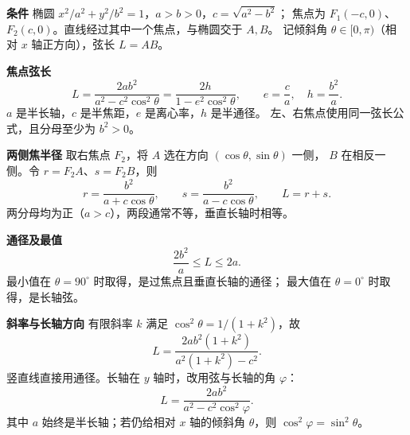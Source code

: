 \begin{statementbox}
\textbf{\textcolor{CStatement}{条件}}
椭圆 $x^2/a^2+y^2/b^2=1$，$a>b>0$，$c=\sqrt{a^2-b^2}$；
焦点为 $F_1(-c,0)$、$F_2(c,0)$。直线经过其中一个焦点，与椭圆交于 $A,B$。
记倾斜角 $\theta\in[0,\pi)$（相对 $x$ 轴正方向），弦长 $L=AB$。

\medskip
\textbf{\textcolor{CStatement}{焦点弦长}}
\[
 \boxed{L=\frac{2ab^2}{a^2-c^2\cos^2\theta}
 =\frac{2h}{1-e^2\cos^2\theta}},\qquad e=\frac ca,\quad h=\frac{b^2}{a}.
\]
$a$ 是半长轴，$c$ 是半焦距，$e$ 是离心率，$h$ 是半通径。
左、右焦点使用同一弦长公式，且分母至少为 $b^2>0$。

\medskip
\textbf{\textcolor{CStatement}{两侧焦半径}}
取右焦点 $F_2$，将 $A$ 选在方向 $(\cos\theta,\sin\theta)$ 一侧，
$B$ 在相反一侧。令 $r=F_2A$、$s=F_2B$，则
\[
 r=\frac{b^2}{a+c\cos\theta},\qquad
 s=\frac{b^2}{a-c\cos\theta},\qquad \boxed{L=r+s}.
\]
两分母均为正（$a>c$），两段通常不等，垂直长轴时相等。

\medskip
\textbf{\textcolor{CStatement}{通径及最值}}
\[
 \boxed{\frac{2b^2}{a}\le L\le2a}.
\]
最小值在 $\theta=90^\circ$ 时取得，是过焦点且垂直长轴的通径；
最大值在 $\theta=0^\circ$ 时取得，是长轴弦。

\medskip
\textbf{\textcolor{CStatement}{斜率与长轴方向}}
有限斜率 $k$ 满足 $\cos^2\theta=1/(1+k^2)$，故
\[
 L=\frac{2ab^2(1+k^2)}{a^2(1+k^2)-c^2}.
\]
竖直线直接用通径。长轴在 $y$ 轴时，改用弦与长轴的角 $\varphi$：
\[
 L=\frac{2ab^2}{a^2-c^2\cos^2\varphi}.
\]
其中 $a$ 始终是半长轴；若仍给相对 $x$ 轴的倾斜角 $\theta$，则 $\cos^2\varphi=\sin^2\theta$。
\end{statementbox}
